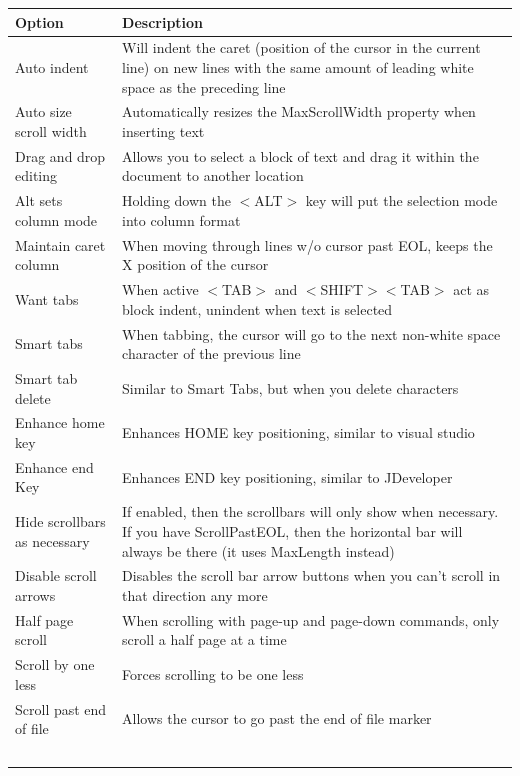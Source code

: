 \begin{table}
  \begin{footnotesize}
    \begin{tabularx}{\headwidth}{lX}\\
      \hline
      \textbf{Option} & \textbf{Description} \\
      \hline %
      Auto indent & Will indent the caret (position of the cursor in the current line) on new lines with the same amount of leading white space as the preceding line \\
      Auto size scroll width & Automatically resizes the MaxScrollWidth property when inserting text \\
      Drag and drop editing & Allows you to select a block of text and drag it within the document to another location \\
      Alt sets column mode & Holding down the $<$ALT$>$ key will put the selection mode into column format \\
      Maintain caret column & When moving through lines w/o cursor past EOL, keeps the X position of the cursor \\
      Want tabs & When active $<$TAB$>$ and $<$SHIFT$>$$<$TAB$>$ act as block indent, unindent when text is selected \\
      Smart tabs & When tabbing, the cursor will go to the next non-white space character of the previous line \\
      Smart tab delete & Similar to Smart Tabs, but when you delete characters \\
      Enhance home key & Enhances HOME key positioning, similar to visual studio \\
      Enhance end Key & Enhances END key positioning, similar to JDeveloper \\
      Hide scrollbars as necessary & If enabled, then the scrollbars will only show when necessary.
      If you have ScrollPastEOL, then the horizontal bar will always be there (it uses MaxLength instead) \\
      Disable scroll arrows & Disables the scroll bar arrow buttons when you can't scroll in that direction any more \\
      Half page scroll & When scrolling with page-up and page-down commands, only scroll a half page at a time \\
      Scroll by one less & Forces scrolling to be one less \\
      Scroll past end of file & Allows the cursor to go past the end of file marker \\
$$
\end{tabularx}
\end{footnotesize}
\end{table}
